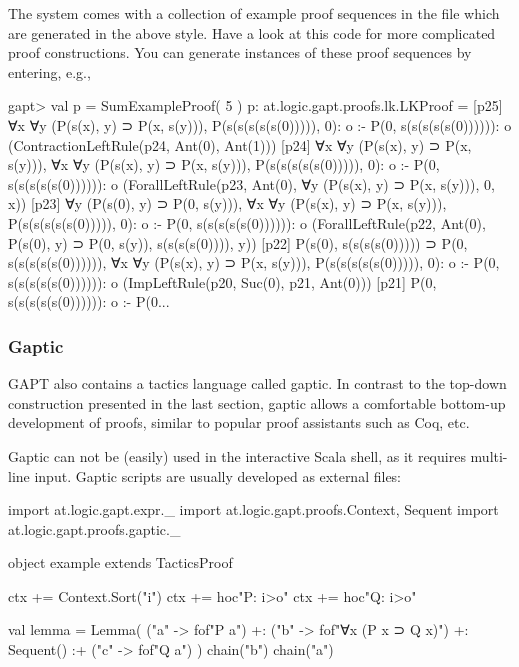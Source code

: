 \documentclass[a4paper,11pt]{article}
\newcommand{\cli}[1]{{\ttfamily {#1}}}
\begin{document}
The system comes with a collection of example proof sequences in the file
\cli{examples/ProofSequences.scala} which are generated in the above style.
Have a look at this code for more complicated proof constructions.
You can generate instances of these proof sequences by entering, e.g.,
\begin{clilisting}
gapt> val p = SumExampleProof( 5 )
p: at.logic.gapt.proofs.lk.LKProof =
[p25] ∀x ∀y (P(s(x), y) ⊃ P(x, s(y))),
P(s(s(s(s(s(0))))), 0): o
:-
P(0, s(s(s(s(s(0)))))): o    (ContractionLeftRule(p24, Ant(0), Ant(1)))
[p24] ∀x ∀y (P(s(x), y) ⊃ P(x, s(y))),
∀x ∀y (P(s(x), y) ⊃ P(x, s(y))),
P(s(s(s(s(s(0))))), 0): o
:-
P(0, s(s(s(s(s(0)))))): o    (ForallLeftRule(p23, Ant(0), ∀y (P(s(x), y) ⊃ P(x, s(y))), 0, x))
[p23] ∀y (P(s(0), y) ⊃ P(0, s(y))),
∀x ∀y (P(s(x), y) ⊃ P(x, s(y))),
P(s(s(s(s(s(0))))), 0): o
:-
P(0, s(s(s(s(s(0)))))): o    (ForallLeftRule(p22, Ant(0), P(s(0), y) ⊃ P(0, s(y)), s(s(s(s(0)))), y))
[p22] P(s(0), s(s(s(s(0))))) ⊃ P(0, s(s(s(s(s(0)))))),
∀x ∀y (P(s(x), y) ⊃ P(x, s(y))),
P(s(s(s(s(s(0))))), 0): o
:-
P(0, s(s(s(s(s(0)))))): o    (ImpLeftRule(p20, Suc(0), p21, Ant(0)))
[p21] P(0, s(s(s(s(s(0)))))): o :- P(0...
\end{clilisting}

\subsubsection{Gaptic}

GAPT also contains a tactics language called gaptic.  In contrast to the
top-down construction presented in the last section, gaptic allows a
comfortable bottom-up development of proofs, similar to popular proof
assistants such as Coq, etc.

Gaptic can not be (easily) used in the interactive Scala shell, as it requires
multi-line input.  Gaptic scripts are usually developed as external files:
\begin{tacticslisting}
import at.logic.gapt.expr._
import at.logic.gapt.proofs.{Context, Sequent}
import at.logic.gapt.proofs.gaptic._

object example extends TacticsProof {
  ctx += Context.Sort("i")
  ctx += hoc"P: i>o"
  ctx += hoc"Q: i>o"

  val lemma = Lemma(
    ("a" -> fof"P a") +:
    ("b" -> fof"∀x (P x ⊃ Q x)") +:
    Sequent()
    :+ ("c" -> fof"Q a")
  ) {
    chain("b")
    chain("a")
  }
}
\end{tacticslisting}
\begin{tacticsoutput}
\end{tacticsoutput}
\end{document}
